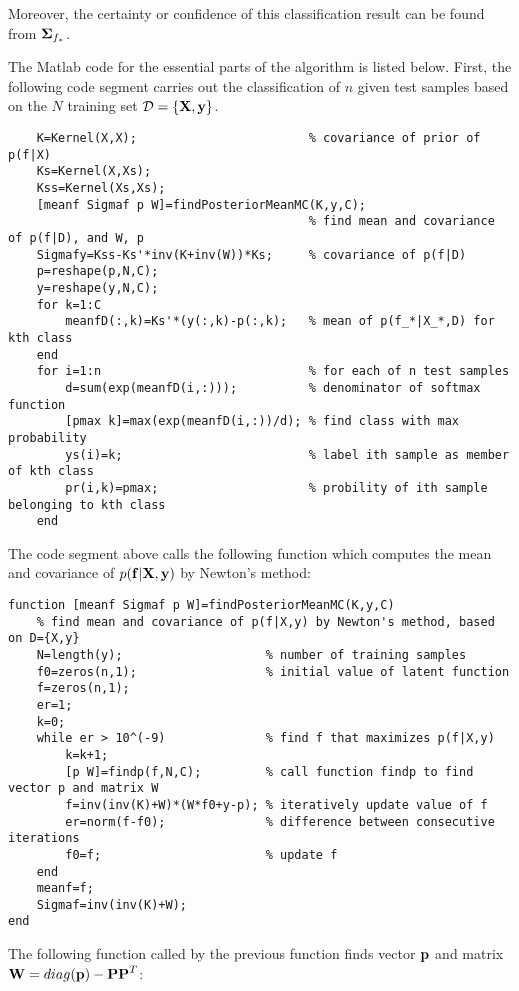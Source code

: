 \documentclass{article}
\begin{document}
Moreover, the certainty or confidence of this classification result 
can be found from ${\bf\Sigma}_{f_*}$.


The Matlab code for the essential parts of the algorithm is 
listed below. First, the following code segment carries out the 
classification of $n$ given test samples based on the $N$ training 
set ${\cal D}=\{{\bf X},{\bf y}\}$. 

\begin{verbatim}
    K=Kernel(X,X);                        % covariance of prior of p(f|X)
    Ks=Kernel(X,Xs);
    Kss=Kernel(Xs,Xs);
    [meanf Sigmaf p W]=findPosteriorMeanMC(K,y,C);  
                                          % find mean and covariance of p(f|D), and W, p
    Sigmafy=Kss-Ks'*inv(K+inv(W))*Ks;     % covariance of p(f|D) 
    p=reshape(p,N,C);
    y=reshape(y,N,C);
    for k=1:C
        meanfD(:,k)=Ks'*(y(:,k)-p(:,k);   % mean of p(f_*|X_*,D) for kth class
    end
    for i=1:n                             % for each of n test samples
        d=sum(exp(meanfD(i,:)));          % denominator of softmax function
        [pmax k]=max(exp(meanfD(i,:))/d); % find class with max probability
        ys(i)=k;                          % label ith sample as member of kth class
        pr(i,k)=pmax;                     % probility of ith sample belonging to kth class 
    end
\end{verbatim}


The code segment above calls the following function which computes the
mean and covariance of $p({\bf f}|{\bf X},{\bf y})$ by Newton's method:

\begin{verbatim}
function [meanf Sigmaf p W]=findPosteriorMeanMC(K,y,C)     
    % find mean and covariance of p(f|X,y) by Newton's method, based on D={X,y}
    N=length(y);                    % number of training samples
    f0=zeros(n,1);                  % initial value of latent function
    f=zeros(n,1);        
    er=1;
    k=0;  
    while er > 10^(-9)              % find f that maximizes p(f|X,y)
        k=k+1;
        [p W]=findp(f,N,C);         % call function findp to find vector p and matrix W
        f=inv(inv(K)+W)*(W*f0+y-p); % iteratively update value of f
        er=norm(f-f0);              % difference between consecutive iterations
        f0=f;                       % update f
    end
    meanf=f;
    Sigmaf=inv(inv(K)+W);            
end

\end{verbatim}

The following function called by the previous function finds vector 
${\bf p}$ and matrix ${\bf W}=diag({\bf p})-{\bf PP}^T$:
\end{document}
